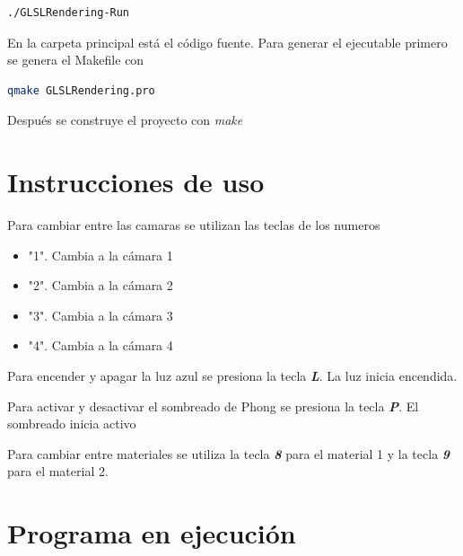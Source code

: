 \documentclass[12pt]{article}
\begin{document}
\begin{lstlisting}[language=bash,title={bash}]
./GLSLRendering-Run
\end{lstlisting}


En la carpeta principal está el código fuente. Para generar el ejecutable primero se genera el Makefile con

\begin{lstlisting}[language=bash,title={bash}]
 qmake GLSLRendering.pro
\end{lstlisting}

Después se construye el proyecto con \textit{make}



\section{Instrucciones de uso}


Para cambiar entre las camaras se utilizan las teclas de los numeros
\begin{itemize}
\item "1". Cambia a la cámara 1
\item "2". Cambia a la cámara 2
\item "3". Cambia a la cámara 3
\item "4". Cambia a la cámara 4

\end{itemize}


Para encender y apagar la luz azul se presiona la tecla \textbf{\textit{L}}. La luz inicia encendida.

Para activar y desactivar el sombreado de Phong se presiona la tecla \textbf{\textit{P}}. El sombreado inicia activo

Para cambiar entre materiales se utiliza la tecla \textbf{\textit{8}} para el material 1 y la tecla \textbf{\textit{9}} para el material 2.




\section{Programa en ejecución}
\end{document}
